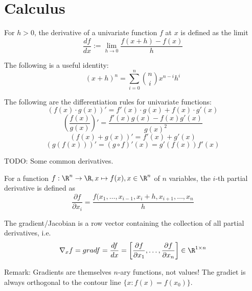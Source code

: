 \section{Calculus}
For $h > 0$, the derivative of a univariate function $f$ at $x$ is defined as
the limit
\begin{equation*}
    \frac{df}{dx} := \lim_{h \to 0}{\frac{f(x + h) - f(x)}{h}}
\end{equation*}

The following is a useful identity:
\begin{equation*}
    (x + h)^n = \sum_{i = 0}^n{\binom{n}{i} x^{n - i}h^i}
\end{equation*}

The following are the differentiation rules for univariate functions:
\begin{equation*}
    (f(x) \cdot g(x))' = f'(x) \cdot g(x) + f(x) \cdot g'(x)
\end{equation*}
\begin{equation*}
    \left( \frac{f(x)}{g(x)} \right)' = \frac{f'(x) g(x) - f(x) g'(x)}{g(x)^2}
\end{equation*}
\begin{equation*}
    (f(x) + g(x))' = f'(x) + g'(x)
\end{equation*}
\begin{equation*}
    (g(f(x)))' = (g \circ f)'(x) = g'(f(x)) f'(x)
\end{equation*}

TODO: Some common derivatives.

For a function $f : \R^n \to \R, x \mapsto f(x), x \in \R^n$
of $n$ variables, the $i$-th partial derivative is defined as
\begin{equation*}
    \frac{\partial f}{\partial x_i} = \frac{f(x_1, \dotsc, x_{i - 1}, x_i + h, x_{i + 1}, \dotsc, x_n}{h}
\end{equation*}

The gradient/Jacobian is a row vector containing the collection of all partial derivatives, i.e.
\begin{equation*}
    \nabla_x{f} = grad f = \frac{d f}{d x} = \left[ \frac{\partial f}{\partial x_1}, \dotsc, \frac{\partial f}{\partial x_n} \right] \in \R^{1 \times n}
\end{equation*}

Remark: Gradients are themselves $n$-ary functions, not values!
The gradiet is always orthogonal to the contour line
$\{x : f(x) = f(x_0)\}$.

